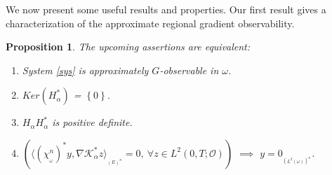 \documentclass{article}
\newtheorem{proposition}[theorem]{Proposition}
\begin{document}
We now present some useful results and properties. 
Our first result gives a characterization 
of the approximate regional gradient observability.

\begin{proposition}
\label{prp1}
The upcoming assertions are equivalent:
\begin{enumerate}
\item[1-] System \eqref{sys} is approximately $G$-observable in $\omega$.
\item[2-] $Ker\left(H_\alpha^*\right)$ = $\left\{0\right\}$.
\item[3-] $H_\alpha H_\alpha^*$ is positive definite.
\item[4-] $\left(\langle\left(\chi_{_\omega}^n\right)^*y, 
\nabla\mathcal{K}_\alpha^*z \rangle_{_{\left(E\right)^n}} = 0, 
\ \forall z\in L^2(0,T;\mathcal{O})\right)$ 
$\implies$ $y=0_{_{\left(L^2(\omega)\right)^n}}$. 
\end{enumerate}
\end{proposition} 
\end{document}
